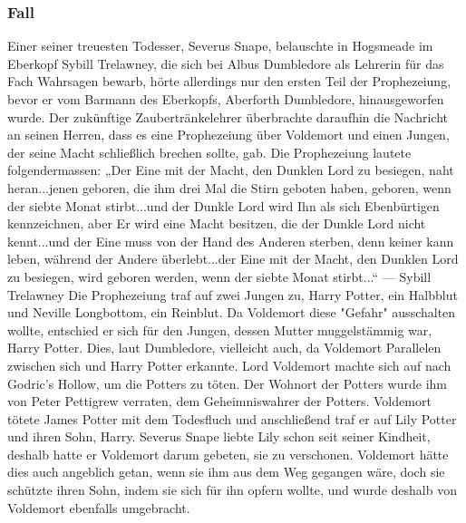 \documentclass[a4paper, 10pt]{article}
\begin{document}
\subsubsection*{\large Fall}
Einer seiner treuesten Todesser, Severus Snape, belauschte in Hogsmeade im Eberkopf Sybill Trelawney, die sich bei Albus Dumbledore als Lehrerin für das Fach Wahrsagen bewarb, hörte allerdings nur den ersten Teil der Prophezeiung, bevor er vom Barmann des Eberkopfs, Aberforth Dumbledore, hinausgeworfen wurde. Der zukünftige Zaubertränkelehrer überbrachte daraufhin die Nachricht an seinen Herren, dass es eine Prophezeiung über Voldemort und einen Jungen, der seine Macht schließlich brechen sollte, gab.
\vspace{10pt}
\newline
Die Prophezeiung lautete folgendermassen:
\vspace{10pt}
\newline
„Der Eine mit der Macht, den Dunklen Lord zu besiegen, naht heran...jenen geboren, die ihm drei Mal die Stirn geboten haben, geboren, wenn der siebte Monat stirbt...und der Dunkle Lord wird Ihn als sich Ebenbürtigen kennzeichnen, aber Er wird eine Macht besitzen, die der Dunkle Lord nicht kennt...und der Eine muss von der Hand des Anderen sterben, denn keiner kann leben, während der Andere überlebt...der Eine mit der Macht, den Dunklen Lord zu besiegen, wird geboren werden, wenn der siebte Monat stirbt...“
\vspace{10pt}
\newline
— Sybill Trelawney
\vspace{10pt}
\newline
Die Prophezeiung traf auf zwei Jungen zu, Harry Potter, ein Halbblut und Neville Longbottom, ein Reinblut. Da Voldemort diese "Gefahr" ausschalten wollte, entschied er sich für den Jungen, dessen Mutter muggelstämmig war, Harry Potter. Dies, laut Dumbledore, vielleicht auch, da Voldemort Parallelen zwischen sich und Harry Potter erkannte.
\vspace{10pt}
\newline
Lord Voldemort machte sich auf nach Godric's Hollow, um die Potters zu töten. Der Wohnort der Potters wurde ihm von Peter Pettigrew verraten, dem Geheimniswahrer der Potters. Voldemort tötete James Potter mit dem Todesfluch und anschließend traf er auf Lily Potter und ihren Sohn, Harry. Severus Snape liebte Lily schon seit seiner Kindheit, deshalb hatte er Voldemort darum gebeten, sie zu verschonen. Voldemort hätte dies auch angeblich getan, wenn sie ihm aus dem Weg gegangen wäre, doch sie schützte ihren Sohn, indem sie sich für ihn opfern wollte, und wurde deshalb von Voldemort ebenfalls umgebracht.
\end{document}
